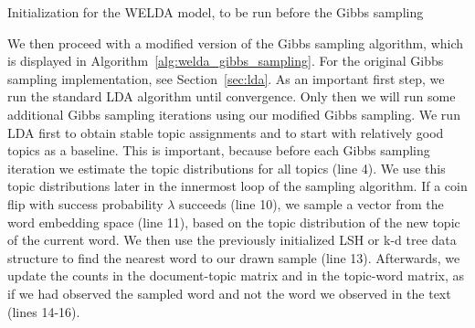 \documentclass[
        a4paper,
        titlepage,
        twoside,
        parskip,
        numbers=noenddot
        ]{scrbook}
\theoremstyle{break}
\begin{document}

\begin{algorithm}
  \caption{Initialization for the WELDA model, to be run before the Gibbs sampling}
  \label{alg:welda_init}
  \begin{algorithmic}[1]
    \EndFor
    \EndProcedure
  \end{algorithmic}
\end{algorithm}

We then proceed with a modified version of the Gibbs sampling algorithm, which is displayed in Algorithm~\ref{alg:welda_gibbs_sampling}.
For the original Gibbs sampling implementation, see Section~\ref{sec:lda}.
As an important first step, we run the standard LDA algorithm until convergence.
Only then we will run some additional Gibbs sampling iterations using our modified Gibbs sampling.
We run LDA first to obtain stable topic assignments and to start with relatively good topics as a baseline.
This is important, because before each Gibbs sampling iteration we estimate the topic distributions for all topics (line 4).
We use this topic distributions later in the innermost loop of the sampling algorithm.
If a coin flip with success probability $\lambda$ succeeds (line 10), we sample a vector from the word embedding space (line 11), based on the topic distribution of the new topic of the current word.
We then use the previously initialized LSH or k-d tree data structure to find the nearest word to our drawn sample (line 13).
Afterwards, we update the counts in the document-topic matrix and in the topic-word matrix, as if we had observed the sampled word and not the word we observed in the text (lines 14-16).
\end{document}

